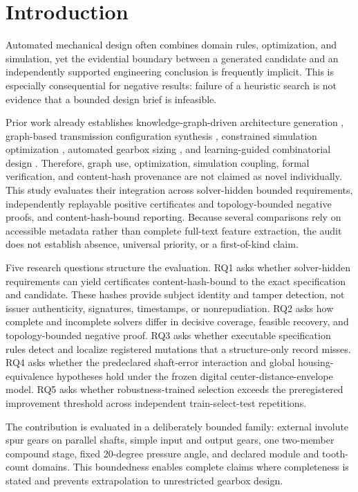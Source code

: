 \documentclass[preprint,12pt]{elsarticle}
\begin{document}
\section{Introduction}
Automated mechanical design often combines domain rules, optimization, and simulation, yet the evidential boundary between a generated candidate and an independently supported engineering conclusion is frequently implicit. This is especially consequential for negative results: failure of a heuristic search is not evidence that a bounded design brief is infeasible.

Prior work already establishes knowledge-graph-driven architecture generation \cite{huang-2025,sun-2026}, graph-based transmission configuration synthesis \cite{geng-2023}, constrained simulation optimization \cite{cicconi-2020}, automated gearbox sizing \cite{fuerst-2021}, and learning-guided combinatorial design \cite{lin-2023}. Therefore, graph use, optimization, simulation coupling, formal verification, and content-hash provenance are not claimed as novel individually. This study evaluates their integration across solver-hidden bounded requirements, independently replayable positive certificates and topology-bounded negative proofs, and content-hash-bound reporting. Because several comparisons rely on accessible metadata rather than complete full-text feature extraction, the audit does not establish absence, universal priority, or a first-of-kind claim.

Five research questions structure the evaluation. RQ1 asks whether solver-hidden requirements can yield certificates content-hash-bound to the exact specification and candidate. These hashes provide subject identity and tamper detection, not issuer authenticity, signatures, timestamps, or nonrepudiation. RQ2 asks how complete and incomplete solvers differ in decisive coverage, feasible recovery, and topology-bounded negative proof. RQ3 asks whether executable specification rules detect and localize registered mutations that a structure-only record misses. RQ4 asks whether the predeclared shaft-error interaction and global housing-equivalence hypotheses hold under the frozen digital center-distance-envelope model. RQ5 asks whether robustness-trained selection exceeds the preregistered improvement threshold across independent train-select-test repetitions.

The contribution is evaluated in a deliberately bounded family: external involute spur gears on parallel shafts, simple input and output gears, one two-member compound stage, fixed 20-degree pressure angle, and declared module and tooth-count domains. This boundedness enables complete claims where completeness is stated and prevents extrapolation to unrestricted gearbox design.
\end{document}
